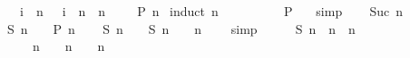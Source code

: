 %
\begin{isabellebody}%
\def\isabellecontext{Tutorial}%
\isamarkupfalse%
%
\isamarkuptrue%
%
\isamarkuptrue%
%
\isamarkuptrue%
\ {\isachardoublequote}{}\ {\isacharasterisk}\ {\isacharparenleft}{\isasymSum}i\ {\isacharless}\ n\ {\isacharplus}\ {}{\isachardot}\ i{\isacharparenright}\ {\isacharequal}\ n\ {\isacharasterisk}\ {\isacharparenleft}n\ {\isacharplus}\ {}{\isacharparenright}{\isachardoublequote}\ \ {\isacharparenleft}\ {\isachardoublequote}{\isacharquery}P\ n{\isachardoublequote}{\isacharparenright}\isanewline
\isamarkupfalse%
\ {\isacharparenleft}induct\ n{\isacharparenright}\isanewline
\ \ \isamarkupfalse%
\ {}\isanewline
\ \ \isamarkupfalse%
\ \isamarkupfalse%
\ {\isachardoublequote}{\isacharquery}P\ {}{\isachardoublequote}\ \isamarkupfalse%
\ simp\isanewline
\isamarkupfalse%
\isanewline
\ \ \isamarkupfalse%
\ {\isacharparenleft}Suc\ n{\isacharparenright}\isanewline
\ \ \isamarkupfalse%
\ {\isachardoublequote}{\isacharquery}S\ n\ {\isacharequal}\ {\isacharunderscore}{\isachardoublequote}\ {\isacharequal}\ {\isachardoublequote}{\isacharquery}P\ n{\isachardoublequote}\isanewline
\ \ \isamarkupfalse%
\ {\isachardoublequote}{\isacharquery}S\ {\isacharparenleft}n\ {\isacharplus}\ {}{\isacharparenright}\ {\isacharequal}\ {\isacharquery}S\ n\ {\isacharplus}\ {}\ {\isacharasterisk}\ {\isacharparenleft}n\ {\isacharplus}\ {}{\isacharparenright}{\isachardoublequote}\ \isamarkupfalse%
\ simp\isanewline
\ \ \isamarkupfalse%
\ \isamarkupfalse%
\ {\isachardoublequote}{\isacharquery}S\ n\ {\isacharequal}\ n\ {\isacharasterisk}\ {\isacharparenleft}n\ {\isacharplus}\ {}{\isacharparenright}{\isachardoublequote}\ \isamarkupfalse%
\isacommand{{\isachardot}}\isanewline
\ \ \isamarkupfalse%
\ \isamarkupfalse%
\ {\isachardoublequote}{\isasymdots}\ {\isacharplus}\ {}\ {\isacharasterisk}\ {\isacharparenleft}n\ {\isacharplus}\ {}{\isacharparenright}\ {\isacharequal}\ {\isacharparenleft}n\ {\isacharplus}\ {}{\isacharparenright}\ {\isacharasterisk}\ {\isacharparenleft}n\ {\isacharplus}\ {}{\isacharparenright}{\isachardoublequote}\ \isamarkupfalse%

\end{isabellebody}
